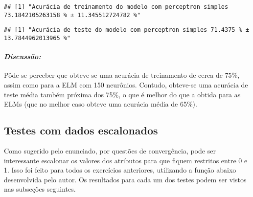 \documentclass[
]{article}
\newenvironment{Shaded}{\begin{snugshade}}{\end{snugshade}}
\newcommand{\KeywordTok}[1]{\textcolor[rgb]{0.13,0.29,0.53}{\textbf{#1}}}
\newcommand{\NormalTok}[1]{#1}
\newcommand{\StringTok}[1]{\textcolor[rgb]{0.31,0.60,0.02}{#1}}
\begin{document}
\begin{verbatim}
## [1] "Acurácia de treinamento do modelo com perceptron simples 73.1842105263158 % ± 11.345512724782 %"
\end{verbatim}

\begin{Shaded}
\end{Shaded}

\begin{verbatim}
## [1] "Acurácia de teste do modelo com perceptron simples 71.4375 % ± 13.7844962013965 %"
\end{verbatim}

\hypertarget{discussuxe3o-3}{%
\paragraph{\texorpdfstring{\textbf{\emph{Discussão:}}}{Discussão:}}\label{discussuxe3o-3}}

Pôde-se perceber que obteve-se uma acurácia de treinamento de cerca de
75\%, assim como para a ELM com 150 neurônios. Contudo, obteve-se uma
acurácia de teste média também próxima dos 75\%, o que é melhor do que a
obtida para as ELMs (que no melhor caso obteve uma acurácia média de
65\%).

\hypertarget{testes-com-dados-escalonados}{%
\subsection{Testes com dados
escalonados}\label{testes-com-dados-escalonados}}

Como sugerido pelo enunciado, por questões de convergência, pode ser
interessante escalonar os valores dos atributos para que fiquem
restritos entre 0 e 1. Isso foi feito para todos os exercícios
anteriores, utilizando a função abaixo desenvolvida pelo autor. Os
resultados para cada um dos testes podem ser vistos nas subseções
seguintes.
\end{document}
